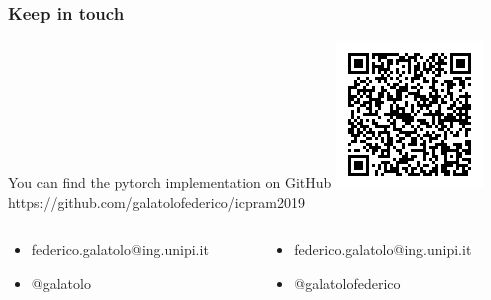 \documentclass{beamer}
\begin{document}
\begin{frame}
    \frametitle{Keep in touch}
    \begin{center}
        \large You can find the pytorch implementation on GitHub
        \includegraphics[width=.30\textwidth]{img/qr.png} \\
        \small https://github.com/galatolofederico/icpram2019
    \end{center}
    \begin{columns}
        \begin{column}{.5\textwidth}
            \begin{itemize}
                \item [\faEnvelope] federico.galatolo@ing.unipi.it
                \item [\faPaperPlane] @galatolo
            \end{itemize}
        \end{column}
        \begin{column}{.5\textwidth}
            \begin{itemize}
                \item [\faGlobe] federico.galatolo@ing.unipi.it
                \item [\faGithub] @galatolofederico
            \end{itemize}
        \end{column}
    \end{columns}
\end{frame}
\end{document}
